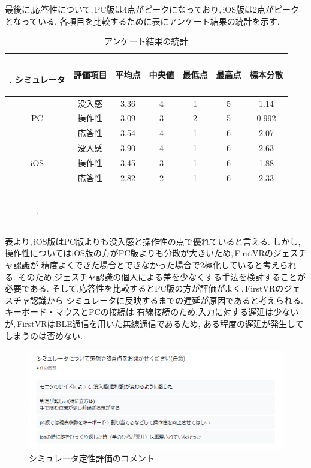 \documentclass{ltjsreport}
\makeatletter
\def\Hline{
  \noalign{\ifnum0=`}\fi\hrule \@height 3.\arrayrulewidth \futurelet
  \reserved@a\@xhline}
\makeatother
\begin{document}
		最後に,応答性について,\,PC版は4点がピークになっており,\,iOS版は2点がピークとなっている.
\clearpage
		各項目を比較するために表にアンケート結果の統計を示す.
		\begin{table}[H]
		\begin{center}
		\caption{アンケート結果の統計}
		\label{tab:resoult}
		\begin{tabular}{cc|ccccc} \Hline
		シミュレータ&評価項目&平均点&中央値&最低点&最高点&標本分散\\ \hline
		&没入感&3.36&4&1&5&1.14\\
		PC&操作性&3.09&3&2&5&0.992\\
		&応答性&3.54&4&1&6&2.07\\ \hline
		&没入感&3.90&4&1&6&2.63\\
		iOS&操作性&3.45&3&1&6&1.88\\
		&応答性&2.82&2&1&6&2.33\\ \Hline
		\end{tabular}
		\end{center}
		\end{table}
		表より,\,iOS版はPC版よりも没入感と操作性の点で優れていると言える.
		しかし,操作性についてはiOS版の方がPC版よりも分散が大きいため,\,FirstVRのジェスチャ認識が
		精度よくできた場合とできなかった場合で2極化していると考えられる.
		そのため,ジェスチャ認識の個人による差を少なくする手法を検討することが必要である.
		そして,応答性を比較するとPC版の方が評価がよく,\,FirstVRのジェスチャ認識から
		シミュレータに反映するまでの遅延が原因であると考えられる.キーボード・マウスとPCの接続は
		有線接続のため,入力に対する遅延は少ないが,\,FirstVRはBLE通信を用いた無線通信であるため,
		ある程度の遅延が発生してしまうのは否めない.

		\begin{figure}[H]
		\centering
		\includegraphics[width = 12cm]{../figs/result.png}
		\caption{シミュレータ定性評価のコメント}
		\label{fig:comment}
		\end{figure}
		\vspace{-15pt}
		
\end{document}

